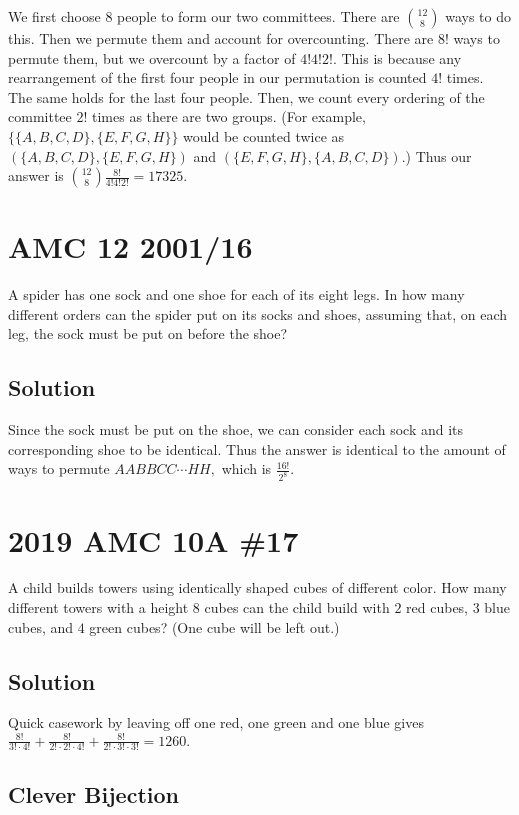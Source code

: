 \documentclass[mast]{lucky}
\begin{document}
We first choose $8$ people to form our two committees. There are $\binom{12}{8}$ ways to do this. Then we permute them and account for overcounting. There are $8!$ ways to permute them, but we overcount by a factor of $4!4!2!.$ This is because any rearrangement of the first four people in our permutation is counted $4!$ times. The same holds for the last four people. Then, we count every ordering of the committee $2!$ times as there are two groups. (For example, $\{\{A,B,C,D\},\{E,F,G,H\}\}$ would be counted twice as $(\{A,B,C,D\},\{E,F,G,H\})$ and $(\{E,F,G,H\},\{A,B,C,D\}).$) Thus our answer is $\binom{12}{8}\frac{8!}{4!4!2!}=17325.$

\pagebreak\section{AMC 12 2001/16}

A spider has one sock and one shoe for each of its eight legs. In how many different orders can the spider put on its socks and shoes, assuming that, on each leg, the sock must be put on before the shoe?

\subsection{Solution}

Since the sock must be put on the shoe, we can consider each sock and its corresponding shoe to be identical. Thus the answer is identical to the amount of ways to permute $AABBCC\cdots HH,$ which is $\frac{16!}{2^8}.$

\pagebreak\section{2019 AMC 10A \#17}

A child builds towers using identically shaped cubes of different color. How many different towers with a height $8$ cubes can the child build with $2$ red cubes, $3$ blue cubes, and $4$ green cubes? (One cube will be left out.)

\subsection{Solution}

Quick casework by leaving off one red, one green and one blue gives $\frac{8!}{3!\cdot4!} + \frac{8!}{2!\cdot2!\cdot4!} + \frac{8!}{2!\cdot3!\cdot3!} = 1260.$

\subsection{Clever Bijection}
\end{document}
